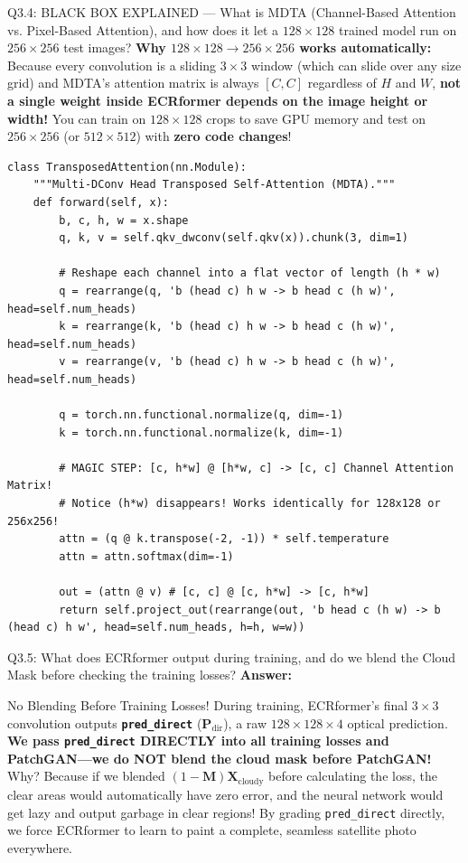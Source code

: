 \documentclass[11pt,a4paper]{article}
\begin{document}
\begin{qbox}{Q3.4: BLACK BOX EXPLAINED — What is MDTA (Channel-Based Attention vs. Pixel-Based Attention), and how does it let a $128\times 128$ trained model run on $256\times 256$ test images?}
\textbf{Why $128\times 128 \to 256\times 256$ works automatically:}
Because every convolution is a sliding $3\times 3$ window (which can slide over any size grid) and MDTA's attention matrix is always $[C, C]$ regardless of $H$ and $W$, \textbf{not a single weight inside ECRformer depends on the image height or width!} You can train on $128\times 128$ crops to save GPU memory and test on $256\times 256$ (or $512\times 512$) with \textbf{zero code changes}!

\begin{lstlisting}[caption={Exact MDTA Channel-Transposed Attention Code (from \texttt{backend/models/module.py})}]
class TransposedAttention(nn.Module):
    """Multi-DConv Head Transposed Self-Attention (MDTA)."""
    def forward(self, x):
        b, c, h, w = x.shape
        q, k, v = self.qkv_dwconv(self.qkv(x)).chunk(3, dim=1)

        # Reshape each channel into a flat vector of length (h * w)
        q = rearrange(q, 'b (head c) h w -> b head c (h w)', head=self.num_heads)
        k = rearrange(k, 'b (head c) h w -> b head c (h w)', head=self.num_heads)
        v = rearrange(v, 'b (head c) h w -> b head c (h w)', head=self.num_heads)

        q = torch.nn.functional.normalize(q, dim=-1)
        k = torch.nn.functional.normalize(k, dim=-1)

        # MAGIC STEP: [c, h*w] @ [h*w, c] -> [c, c] Channel Attention Matrix!
        # Notice (h*w) disappears! Works identically for 128x128 or 256x256!
        attn = (q @ k.transpose(-2, -1)) * self.temperature
        attn = attn.softmax(dim=-1)

        out = (attn @ v) # [c, c] @ [c, h*w] -> [c, h*w]
        return self.project_out(rearrange(out, 'b head c (h w) -> b (head c) h w', head=self.num_heads, h=h, w=w))
\end{lstlisting}
\end{qbox}

\begin{qbox}{Q3.5: What does ECRformer output during training, and do we blend the Cloud Mask before checking the training losses?}
\textbf{Answer:}
\begin{rulebox}{No Blending Before Training Losses!}
During training, ECRformer's final $3\times 3$ convolution outputs \textbf{\texttt{pred\_direct}} ($\mathbf{P}_{\text{dir}}$), a raw $128\times 128\times 4$ optical prediction.
\textbf{We pass \texttt{pred\_direct} DIRECTLY into all training losses and PatchGAN—we do NOT blend the cloud mask before PatchGAN!}
Why? Because if we blended $(1 - \mathbf{M})\mathbf{X}_{\text{cloudy}}$ before calculating the loss, the clear areas would automatically have zero error, and the neural network would get lazy and output garbage in clear regions! By grading \texttt{pred\_direct} directly, we force ECRformer to learn to paint a complete, seamless satellite photo everywhere.
\end{rulebox}
\end{qbox}
\end{document}
